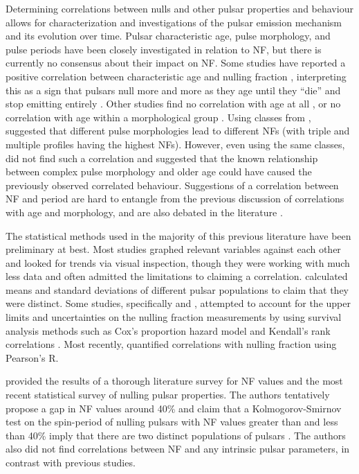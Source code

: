 \documentclass[fleqn,usenatbib]{mnras}
\begin{document}
Determining correlations between nulls and other pulsar properties and behaviour allows for characterization and investigations of the pulsar emission mechanism and its evolution over time. Pulsar characteristic age, pulse morphology, and pulse periods have been closely investigated in relation to NF, but there is currently no consensus about their impact on NF. Some studies have reported a positive correlation between characteristic age and nulling fraction \citep{ritchings1976pulsar, wang2007pulsar}, interpreting this as a sign that pulsars null more and more as they age until they ``die'' and stop emitting entirely \citep{ritchings1976pulsar}. Other studies find no correlation with age at all \citep{biggs1992analysis}, or no correlation with age within a morphological group \citep{Rankin1986}. Using classes from \citet{Rankin1983}, \citet{Rankin1986} suggested that different pulse morphologies lead to different NFs (with triple and multiple profiles having the highest NFs). However, even using the same classes, \citet{wang2007pulsar} did not find such a correlation and suggested that the known relationship between complex pulse morphology and older age \citep{huguenin1971properties} could have caused the previously observed correlated behaviour. Suggestions of a correlation between NF and period \citep{ritchings1976pulsar, biggs1992analysis} are hard to entangle from the previous discussion of correlations with age and morphology, and are also debated in the literature \citep{Rankin1986}.

The statistical methods used in the majority of this previous literature have been preliminary at best. Most studies graphed relevant variables against each other and looked for trends via visual inspection, though they were working with much less data and often admitted the limitations to claiming a correlation. \citet{Rankin1986} calculated means and standard deviations of different pulsar populations to claim that they were distinct. Some studies, specifically \citet{biggs1992analysis} and \citet{Li1995}, attempted to account for the upper limits and uncertainties on the nulling fraction measurements by using survival analysis methods such as Cox's proportion hazard model \citep{cox1972regression} and Kendall's rank correlations \citep{kendall1938new}. Most recently, \citet{Konar2019} quantified correlations with nulling fraction using Pearson's R.

\citet{Konar2019} provided the results of a thorough literature survey for NF values and the most recent statistical survey of nulling pulsar properties. The authors tentatively propose a gap in NF values around 40\% and claim that a Kolmogorov-Smirnov test on the spin-period of nulling pulsars with NF values greater than and less than 40\% imply that there are two distinct populations of pulsars \citep{Konar2019}. The authors also did not find correlations between NF and any intrinsic pulsar parameters, in contrast with previous studies.
\end{document}
